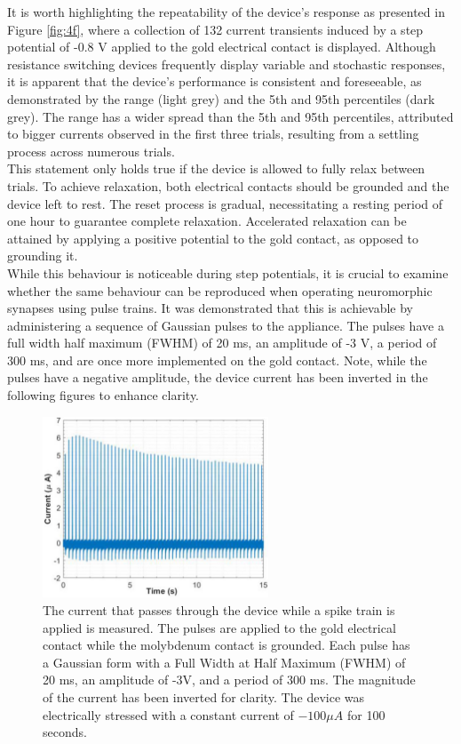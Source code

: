 \noindent It is worth highlighting the repeatability of the device's response as presented in Figure \ref{fig:4f}, where a collection of 132 current transients induced by a step potential of -0.8 V applied to the gold electrical contact is displayed. Although resistance switching devices frequently display variable and stochastic responses, it is apparent that the device's performance is consistent and foreseeable, as demonstrated by the range (light grey) and the 5th and 95th percentiles (dark grey). The range has a wider spread than the 5th and 95th percentiles, attributed to bigger currents observed in the first three trials, resulting from a settling process across numerous trials.\\

\noindent This statement only holds true if the device is allowed to fully relax between trials. To achieve relaxation, both electrical contacts should be grounded and the device left to rest. The reset process is gradual, necessitating a resting period of one hour to guarantee complete relaxation. Accelerated relaxation can be attained by applying a positive potential to the gold contact, as opposed to grounding it.\\

\noindent While this behaviour is noticeable during step potentials, it is crucial to examine whether the same behaviour can be reproduced when operating neuromorphic synapses using pulse trains. It was demonstrated that this is achievable by administering a sequence of Gaussian pulses to the appliance. The pulses have a full width half maximum (FWHM) of 20 ms, an amplitude of -3 V, a period of 300 ms, and are once more implemented on the gold contact. Note, while the pulses have a negative amplitude, the device current has been inverted in the following figures to enhance clarity.\\


\begin{figure}[htbp!] 
    \centering    
    \includegraphics[width=0.6\textwidth]{Chapter4/Figs/g.png}
    \caption[Device response to a spike train.]{The current that passes through the device while a spike train is applied is measured. The pulses are applied to the gold electrical contact while the molybdenum contact is grounded. Each pulse has a Gaussian form with a Full Width at Half Maximum (FWHM) of 20 ms, an amplitude of -3V, and a period of 300 ms. The magnitude of the current has been inverted for clarity. The device was electrically stressed with a constant current of $-100\mu A$ for 100 seconds.}
    \label{fig:4g}
    \end{figure}
    
